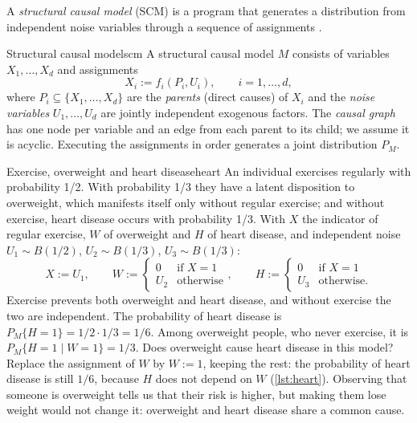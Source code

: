 A \emph{structural causal model} (SCM) is a program that generates a distribution from independent
noise variables through a sequence of assignments \citep{pearl2009causality,peters2017elements}.

\begin{definition}{Structural causal model}{scm}
A structural causal model $M$ consists of variables $X_1,\dots,X_d$ and assignments
\begin{equation}
  X_i:=f_i(P_i,U_i),\qquad i=1,\dots,d,
\end{equation}
where $P_i\subseteq\{X_1,\dots,X_d\}$ are the \emph{parents} (direct causes) of $X_i$ and the
\emph{noise variables} $U_1,\dots,U_d$ are jointly independent exogenous factors. The \emph{causal
graph} has one node per variable and an edge from each parent to its child; we assume it is
acyclic. Executing the assignments in order generates a joint distribution $P_M$.
\end{definition}

\begin{example}{Exercise, overweight and heart disease}{heart}
An individual exercises regularly with probability 1/2. With probability 1/3 they have a latent
disposition to overweight, which manifests itself only without regular exercise; and without
exercise, heart disease occurs with probability 1/3. With $X$ the indicator of regular exercise,
$W$ of overweight and $H$ of heart disease, and independent noise $U_1\sim B(1/2)$,
$U_2\sim B(1/3)$, $U_3\sim B(1/3)$:
\begin{equation*}
  X:=U_1,\qquad W:=\begin{cases}0 & \text{if } X=1\\ U_2 & \text{otherwise}\end{cases},\qquad
  H:=\begin{cases}0 & \text{if } X=1\\ U_3 & \text{otherwise.}\end{cases}
\end{equation*}
Exercise prevents both overweight and heart disease, and without exercise the two are
independent. The probability of heart disease is $P_M\{H=1\}=1/2\cdot1/3=1/6$. Among overweight
people, who never exercise, it is $P_M\{H=1\mid W=1\}=1/3$. Does overweight cause heart disease in
this model? Replace the assignment of $W$ by $W:=1$, keeping the rest: the probability of heart
disease is still $1/6$, because $H$ does not depend on $W$ (\cref{lst:heart}). Observing that
someone is overweight tells us that their risk is higher, but making them lose weight would not
change it: overweight and heart disease share a common cause.
\end{example}

